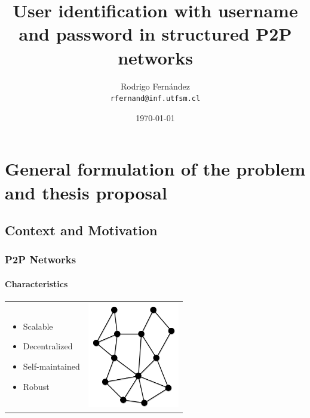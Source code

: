 \documentclass[12pt]{beamer}
\title{User identification with username and password in structured P2P networks}
\subtitle{}
\author[R. Fernández]{Rodrigo Fernández \\ \small{\texttt{rfernand@inf.utfsm.cl}}}
\institute[]{Universidad Técnica Federico Santa María}
\date{\today}
\begin{document}

  \frame{\titlepage}
  \frame{\tableofcontents}
	\section{}
  \section{General formulation of the problem and thesis proposal}
  \subsection{Context and Motivation}

  \begin{frame}
  \frametitle{P2P Networks}
  \framesubtitle{Characteristics}
  \begin{table}
  \begin{tabular}{p{7cm}p{3cm}}
  \begin{itemize}
    \item Scalable
    \item Decentralized
    \item Self-maintained
    \item Robust
  \end{itemize}
  &
  \vspace{1.5cm}
  \includegraphics[width=4cm]{../../presentacion/img/p2p-unstructured}\\
  \end{tabular}
  \end{table}
  \end{frame}
  
\end{document}
